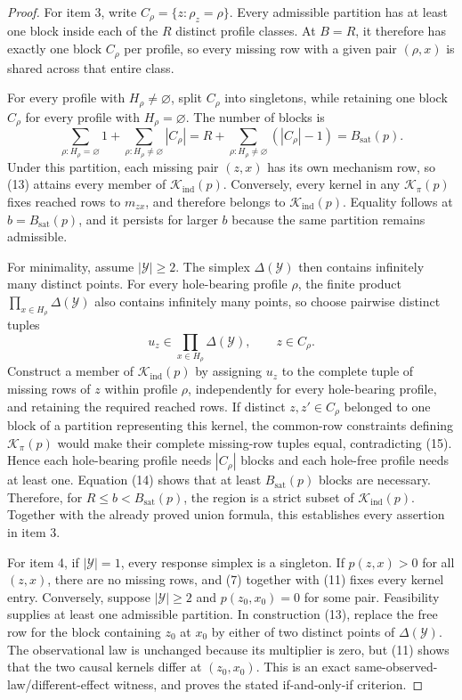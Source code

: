 \documentclass{article}
\begin{document}
\begin{proof}
For item 3, write \(C_\rho=\{z:\rho_z=\rho\}\).  Every admissible
partition has at least one block inside each of the \(R\) distinct
profile classes.  At \(B=R\), it therefore has exactly one block
\(C_\rho\) per profile, so every missing row with a given pair
\((\rho,x)\) is shared across that entire class.

For every profile with \(H_\rho\ne\varnothing\), split \(C_\rho\) into
singletons, while retaining one block \(C_\rho\) for every profile with
\(H_\rho=\varnothing\).  The number of blocks is
\[
 \sum_{\rho:H_\rho=\varnothing}1
 +\sum_{\rho:H_\rho\ne\varnothing}|C_\rho|
 =R+\sum_{\rho:H_\rho\ne\varnothing}(|C_\rho|-1)
 =B_{\mathrm{sat}}(p).
 \tag{14}
\]
Under this partition, each missing pair \((z,x)\) has its own mechanism
row, so (13) attains every member of
\(\mathcal K_{\mathrm{ind}}(p)\).  Conversely, every kernel in any
\(\mathcal K_\pi(p)\) fixes reached rows to \(m_{zx}\), and therefore
belongs to \(\mathcal K_{\mathrm{ind}}(p)\).  Equality follows at
\(b=B_{\mathrm{sat}}(p)\), and it persists for larger \(b\) because
the same partition remains admissible.

For minimality, assume \(|\mathcal Y|\geq2\).  The simplex
\(\Delta(\mathcal Y)\) then contains infinitely many distinct points.
For every hole-bearing profile \(\rho\), the finite product
\(\prod_{x\in H_\rho}\Delta(\mathcal Y)\) also contains infinitely
many points, so choose pairwise distinct tuples
\[
 u_z\in\prod_{x\in H_\rho}\Delta(\mathcal Y),
 \qquad z\in C_\rho.
 \tag{15}
\]
Construct a member of \(\mathcal K_{\mathrm{ind}}(p)\) by assigning
\(u_z\) to the complete tuple of missing rows of \(z\) within profile
\(\rho\), independently for every hole-bearing profile, and retaining
the required reached rows.  If distinct \(z,z'\in C_\rho\) belonged to
one block of a partition representing this kernel, the common-row
constraints defining \(\mathcal K_\pi(p)\) would make their complete
missing-row tuples equal, contradicting (15).  Hence each hole-bearing
profile needs \(|C_\rho|\) blocks and each hole-free profile needs at
least one.  Equation (14) shows that at least
\(B_{\mathrm{sat}}(p)\) blocks are necessary.  Therefore, for
\(R\leq b<B_{\mathrm{sat}}(p)\), the region is a strict subset of
\(\mathcal K_{\mathrm{ind}}(p)\).  Together with the already proved
union formula, this establishes every assertion in item 3.

For item 4, if \(|\mathcal Y|=1\), every response simplex is a singleton.
If \(p(z,x)>0\) for all \((z,x)\), there are no missing rows, and
(7) together with (11) fixes every kernel entry.  Conversely, suppose
\(|\mathcal Y|\geq2\) and \(p(z_0,x_0)=0\) for some pair.  Feasibility
supplies at least one admissible partition.  In construction (13), replace
the free row for the block containing \(z_0\) at \(x_0\) by either of
two distinct points of \(\Delta(\mathcal Y)\).  The observational law is
unchanged because its multiplier is zero, but (11) shows that the two
causal kernels differ at \((z_0,x_0)\).  This is an exact
same-observed-law/different-effect witness, and proves the stated
if-and-only-if criterion.


\end{proof}
\end{document}

